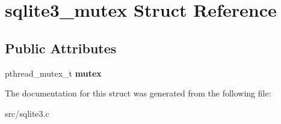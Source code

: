 \hypertarget{structsqlite3__mutex}{\section{sqlite3\-\_\-mutex Struct Reference}
\label{structsqlite3__mutex}
}
\subsection*{Public Attributes}
\begin{DoxyCompactItemize}
\item 
\hypertarget{structsqlite3__mutex_a6eef25bee73a3640dbbd052d707dbfdc}{pthread\-\_\-mutex\-\_\-t {\bfseries mutex}}\label{structsqlite3__mutex_a6eef25bee73a3640dbbd052d707dbfdc}

\end{DoxyCompactItemize}


The documentation for this struct was generated from the following file\-:\begin{DoxyCompactItemize}
\item 
src/sqlite3.\-c\end{DoxyCompactItemize}
